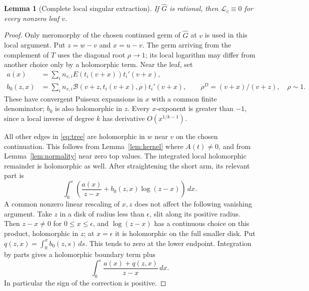 \documentclass[11pt]{article}
\numberwithin{equation}{section}
\newtheorem{lemma}[theorem]{Lemma}
\theoremstyle{definition}\newtheorem{definition}[theorem]{Definition}
\theoremstyle{remark}\newtheorem{remark}[theorem]{Remark}
\newcommand{\HH}{\widehat G}
\newcommand{\dd}{\,d}
\begin{document}
\begin{lemma}[Complete local singular extraction]\label{lem:local-extraction}
If $\HH$ is rational, then $\mathscr L_v\equiv0$ for every nonzero leaf $v$.
\end{lemma}
\begin{proof}
Only meromorphy of the chosen continued germ of $\HH$ at $v$ is
used in this local argument. Put $z=w-v$ and $x=u-v$. The germ arriving
from the complement of $T$ uses the diagonal root $\rho\to1$; its local
logarithm may differ from another choice only by a holomorphic term.
Near the leaf, set
\begin{align*}
 a(x)&=\sum_i n_{v,i}E(t_i(v+x))t_i'(v+x),\\
 b_0(z,x)&=\sum_i n_{v,i}
 \mathscr B(v+z,t_i(v+x),\rho)t_i'(v+x),
 \qquad \rho^D=(v+x)/(v+z),\quad\rho\sim1.
\end{align*}
These have convergent Puiseux expansions in $x$ with a common finite
denominator; $b_0$ is also holomorphic in $z$. Every $x$-exponent is
greater than $-1$, since a local inverse of degree $k$ has derivative
$O(x^{1/k-1})$.

All other edges in \eqref{eq:tree} are holomorphic in $w$ near $v$ on the
chosen continuation. This follows from Lemma~\ref{lem:kernel} where
$A(t)\ne0$, and from Lemma~\ref{lem:normality} near zero top values.
The integrated local holomorphic remainder is holomorphic as well.
After straightening the short arm, its relevant part is
\[
 \int_0^\epsilon
 \left(\frac{a(x)}{z-x}+b_0(z,x)\log(z-x)\right)\dd x.
\]
A common nonzero linear rescaling of $x,z$ does not affect the following
vanishing argument. Take $z$ in a disk of radius less than $\epsilon$,
slit along its positive radius. Then $z-x\ne0$ for $0\le x\le\epsilon$,
and $\log(z-x)$ has a continuous choice on this product, holomorphic
in $z$; at $x=\epsilon$ it is holomorphic on the full smaller disk.
Put $q(z,x)=\int_0^x b_0(z,s)\dd s$. This tends to zero at the lower endpoint.
Integration by parts gives a holomorphic boundary term plus
\begin{equation}\label{eq:corrected-cauchy}
 \int_0^\epsilon\frac{a(x)+q(z,x)}{z-x}\dd x.
\end{equation}
In particular the sign of the correction is positive.


\end{proof}
\end{document}
